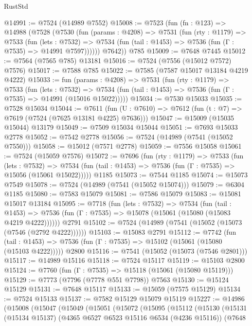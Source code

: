 \begin{lexlean}{RustStd}
\begin{coremodule}
@14991 := @7524 (@14989 @7552)
@15008 := @7523
    (fun (fn : @123) =>
    @14988
      (@7528
        (@7530
          (fun (params : @4208) =>
          @7531
            (fun (rty : @1179) =>
            @7533
              (fun (lets : @7532) =>
              @7534 (fun (tail : @1453) => @7536 (fun (Γ : @7535) => @14991 @7597))))))
        @7642))
    @785
@15009 := @7648 @7445
@15012 := @7564 (@7565 @785) @13181
@15016 := @7524 (@7556 (@15012 @7572) @7576)
@15017 := @7588 @785
@15022 := @7585 (@7587 @15017 @13184 @4219 @4222)
@15033 := fun (params : @4208) =>
  @7531
    (fun (rty : @1179) =>
    @7533
      (fun (lets : @7532) =>
      @7534 (fun (tail : @1453) => @7536 (fun (Γ : @7535) => @14991 (@15016 @15022)))))
@15034 := @7530 @15033
@15035 := @7528 @15034
@15044 := @7611
    (fun (U : @7610) => @7612 (fun (t : @7) => @7619 (@7524 (@7625 @13181 @4225) @7636)))
@15047 := @15009 (@15035 @15044) @13179
@15049 := @7509 @15034 @15044
@15051 := @7693 @15033 @2778
@15052 := @7542 @2778
@15056 := @7524 (@14989 (@7541 (@15052 @7550)))
@15058 := @15012 (@7571 @2778)
@15059 := @7556 @15058
@15061 := @7524 (@15059 @7576)
@15072 := @7696
    (fun (rty : @1179) =>
    @7533
      (fun (lets : @7532) =>
      @7534 (fun (tail : @1453) => @7536 (fun (Γ : @7535) => @15056 (@15061 @15022)))))
    @1185
@15073 := @7544 @1185
@15074 := @15073 @7549
@15078 := @7524 (@14989 (@7541 (@15052 @15074)))
@15079 := @6304 @1185
@15080 := @7583 @15079
@15081 := @7586 @15079
@15083 := @15081 @15017 @13184
@15095 := @7718
    (fun (lets : @7532) =>
    @7534
      (fun (tail : @1453) =>
      @7536 (fun (Γ : @7535) => @15078 (@15061 (@15080 (@15083 @4219 @4222))))))
    @2791
@15102 := @7524 (@14989 (@7541 (@15052 (@15073 (@7546 (@2792 @4222))))))
@15103 := @15083 @2791
@15112 := @7742
    (fun (tail : @1453) => @7536 (fun (Γ : @7535) => @15102 (@15061 (@15080 (@15103 @4222)))))
    @2800
@15116 := @7541 (@15052 (@15073 (@7546 @2801)))
@15117 := @14989 @15116
@15118 := @7524 @15117
@15119 := @15103 @2800
@15124 := @7760 (fun (Γ : @7535) => @15118 (@15061 (@15080 @15119)))
@15129 := @7773 (@7796 (@7778 @551 @7798)) @7563
@15130 := @15124 @15129
@15131 := @7648 @15117
@15133 := @15059 (@7575 @15129)
@15134 := @7524 @15133
@15137 := @7582 @15129 @15079 @15119
@15227 := @14986
    (@15008
      (@15047
        (@15049
          (@15051
            (@15072
              (@15095
                (@15112
                  (@15130
                    (@15131
                      (@15134 @15137)
                      (@4365 @6527 @6523 @15116 @6534 (@4236 @15116))
                      (@7648

\end{coremodule}
\end{lexlean}
